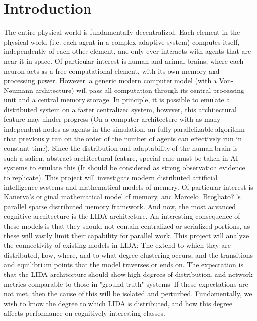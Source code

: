 \documentclass{nature}
\begin{document}
\section{Introduction}
    The entire physical world is fundamentally decentralized. 
    Each element in the physical world (i.e. each agent in a complex adaptive system) computes itself, independently of each other element, and only ever interacts with agents that are near it in space. 
    Of particular interest is human and animal brains, where each neuron acts as a free computational element, with its own memory and processing power.
    However, a generic modern computer model (with a Von-Neumann architecture) will pass all computation through its central processing unit and a central memory storage. 
    In principle, it is possible to emulate a distributed system on a faster centralized system, however, this architectural feature may hinder progress (On a computer architecture with as many independent nodes as agents in the simulation, an fully-parallelizable algorithm that previously ran on the order of the number of agents can effectively run in constant time). 
    Since the distribution and adaptability of the human brain is such a salient abstract architectural feature, special care must be taken in AI systems to emulate this (It should be considered as strong observation evidence to replicate).
    This project will investigate modern distributed artificial intelligence systems and mathematical models of memory. 
    Of particular interest is Kanerva's original mathematical model of memory, and Marcelo [Brogliato?]'s parallel sparse distributed memory framework. 
    And now, the most advanced cognitive architecture is the LIDA architecture. 
    An interesting consequence of these models is that they should not contain centralized or serialized portions, as these will vastly limit their capability for parallel work. 
    This project will analyze the connectivity of existing models in LIDA: The extend to which they are distributed, how, where, and to what degree clustering occurs, and the transitions and equilibrium points that the model traverses or ends on.
    The expectation is that the LIDA architecture should show high degrees of distribution, and network metrics comparable to those in "ground truth" systems. 
    If these expectations are not met, then the cause of this will be isolated and perturbed.
    Fundamentally, we wish to know the degree to which LIDA is distributed, and how this degree affects performance on cognitively interesting classes.
\end{document}
